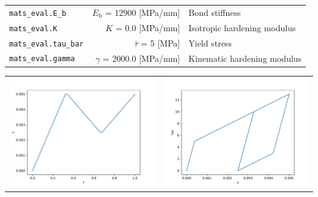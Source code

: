 \documentclass[main.tex]{subfiles}
\begin{document}
\begin{bmcsexample}
\begin{center}
{\begin{longtable}{lrp{4cm}}
\texttt{mats\_eval.E\_b} & $E_\mathrm{b}$ = 12900 [MPa/mm] & {\footnotesize Bond stiffness}  \\
            \texttt{mats\_eval.K} & $K$ = 0.0 [MPa/mm] & {\footnotesize Isotropic hardening modulus}  \\
            \texttt{mats\_eval.tau\_bar} & $\bar{\tau}$ = 5 [MPa] & {\footnotesize Yield stress}  \\
            \texttt{mats\_eval.gamma} & $\gamma$ = 2000.0 [MPa/mm] & {\footnotesize Kinematic hardening modulus}  \\
            \bottomrule 
\end{longtable}
}

\noindent
\begin{tabular}{L{7.5cm}L{7.5cm}}
\includegraphics[width=7.5cm]{examples/e22_bond_slip_plasticity_kinem/fig_s-t.pdf}
 & 
\includegraphics[width=7.5cm]{examples/e22_bond_slip_plasticity_kinem/fig_tau-s.pdf}
 \\\end{tabular}


\end{center}
\end{bmcsexample}
\end{document}
